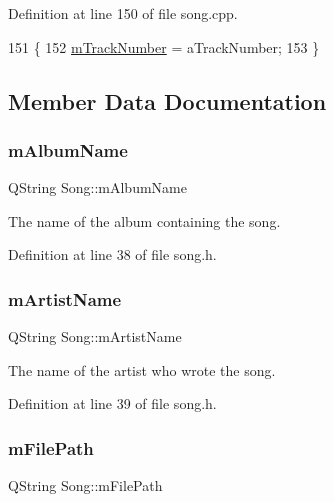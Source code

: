 Definition at line 150 of file song.\+cpp.


\begin{DoxyCode}
151 \{
152     \mbox{\hyperlink{class_song_a45f2f019180a08117bc1992f16fdb5f7}{mTrackNumber}} = aTrackNumber;
153 \}
\end{DoxyCode}


\subsection{Member Data Documentation}
\mbox{\label{class_song_aadf3ea14887a9c5a36a1fe419d7d6222}} 
\subsubsection{\texorpdfstring{m\+Album\+Name}{mAlbumName}}
{\footnotesize\ttfamily Q\+String Song\+::m\+Album\+Name\hspace{0.3cm}{\ttfamily [private]}}



The name of the album containing the song. 



Definition at line 38 of file song.\+h.

\mbox{\label{class_song_a53eb13c6325e01434ee370ba2d9af292}} 
\subsubsection{\texorpdfstring{m\+Artist\+Name}{mArtistName}}
{\footnotesize\ttfamily Q\+String Song\+::m\+Artist\+Name\hspace{0.3cm}{\ttfamily [private]}}



The name of the artist who wrote the song. 



Definition at line 39 of file song.\+h.

\mbox{\label{class_song_af6852312a9369340908b7726d97979a6}} 
\subsubsection{\texorpdfstring{m\+File\+Path}{mFilePath}}
{\footnotesize\ttfamily Q\+String Song\+::m\+File\+Path\hspace{0.3cm}{\ttfamily [private]}}



